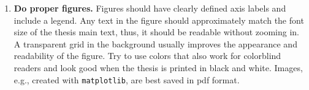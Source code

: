 \documentclass[twoside,11pt]{article}
\begin{document}
\begin{enumerate}
    \item \textbf{Do proper figures.} Figures should have clearly defined axis labels and include a legend. Any text in the figure should approximately match the font size of the thesis main text, thus, it should be readable without zooming in. A transparent grid in the background usually improves the appearance and readability of the figure. Try to use colors that also work for colorblind readers and look good when the thesis is printed in black and white. Images, e.g., created with \texttt{matplotlib}, are best saved in pdf format. 
\end{enumerate}





 \vskip 0.2in
 
\end{document}
